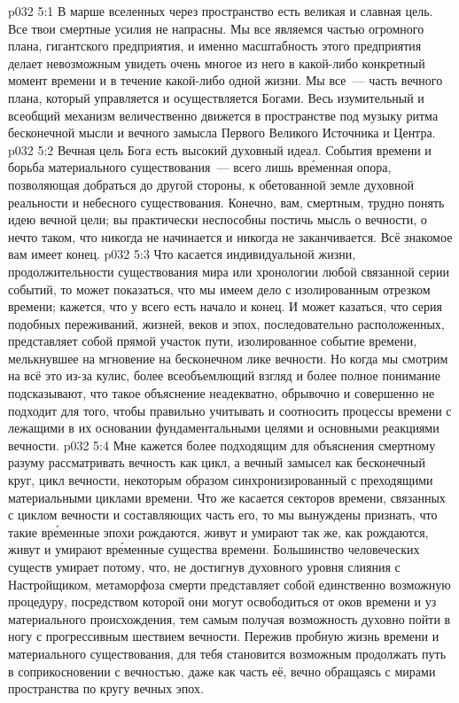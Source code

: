 \vs p032 5:1 В марше вселенных через пространство есть великая и славная цель. Все твои смертные усилия не напрасны. Мы все являемся частью огромного плана, гигантского предприятия, и именно масштабность этого предприятия делает невозможным увидеть очень многое из него в какой\hyp{}либо конкретный момент времени и в течение какой\hyp{}либо одной жизни. Мы все~--- часть вечного плана, который управляется и осуществляется Богами. Весь изумительный и всеобщий механизм величественно движется в пространстве под музыку ритма бесконечной мысли и вечного замысла Первого Великого Источника и Центра.
\vs p032 5:2 Вечная цель Бога есть высокий духовный идеал. События времени и борьба материального существования~--- всего лишь вр\'еменная опора, позволяющая добраться до другой стороны, к обетованной земле духовной реальности и небесного существования. Конечно, вам, смертным, трудно понять идею вечной цели; вы практически неспособны постичь мысль о вечности, о нечто таком, что никогда не начинается и никогда не заканчивается. Всё знакомое вам имеет конец.
\vs p032 5:3 \pc Что касается индивидуальной жизни, продолжительности существования мира или хронологии любой связанной серии событий, то может показаться, что мы имеем дело с изолированным отрезком времени; кажется, что у всего есть начало и конец. И может казаться, что серия подобных переживаний, жизней, веков и эпох, последовательно расположенных, представляет собой прямой участок пути, изолированное событие времени, мелькнувшее на мгновение на бесконечном лике вечности. Но когда мы смотрим на всё это из-за кулис, более всеобъемлющий взгляд и более полное понимание подсказывают, что такое объяснение неадекватно, обрывочно и совершенно не подходит для того, чтобы правильно учитывать и соотносить процессы времени с лежащими в их основании фундаментальными целями и основными реакциями вечности.
\vs p032 5:4 Мне кажется более подходящим для объяснения смертному разуму рассматривать вечность как цикл, а вечный замысел как бесконечный круг, цикл вечности, некоторым образом синхронизированный с преходящими материальными циклами времени. Что же касается секторов времени, связанных с циклом вечности и составляющих часть его, то мы вынуждены признать, что такие вр\'еменные эпохи рождаются, живут и умирают так же, как рождаются, живут и умирают вр\'еменные существа времени. Большинство человеческих существ умирает потому, что, не достигнув духовного уровня слияния с Настройщиком, метаморфоза смерти представляет собой единственно возможную процедуру, посредством которой они могут освободиться от оков времени и уз материального происхождения, тем самым получая возможность духовно пойти в ногу с прогрессивным шествием вечности. Пережив пробную жизнь времени и материального существования, для тебя становится возможным продолжать путь в соприкосновении с вечностью, даже как часть её, вечно обращаясь с мирами пространства по кругу вечных эпох.
